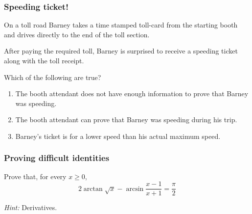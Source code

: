 \documentclass[14pt]{beamer}
\begin{document}
\begin{frame}[t]
	\fontsize{13}{13}\selectfont
	\frametitle{Speeding ticket!}

	On a toll road Barney takes a time stamped toll-card from the starting booth and
	drives directly to the end of the toll section. \\
	\vspace{.2cm}

	After paying the required toll, Barney is surprised to receive a speeding
	ticket along with the toll receipt. \\
	\vspace{.2cm}

	Which of the following are true?
	\vspace{.2cm}
	\begin{enumerate}
		\item The booth attendant does not have enough information to prove that Barney
			was speeding.

		\item The booth attendant can prove that Barney was speeding during his trip.

		\item Barney's ticket is for a lower speed than his actual maximum speed.
	\end{enumerate}
\end{frame}

\begin{frame}[t]
	\frametitle{Proving difficult identities}

	\begin{block}{}
		Prove that, for every $x \geq 0$,
		\[
			2 \arctan \sqrt{x}- \arcsin \frac{x-1}{x+1}= \frac{\pi}{2}
		\]
	\end{block}

	\emph{Hint:} Derivatives.
\end{frame}
\end{document}
